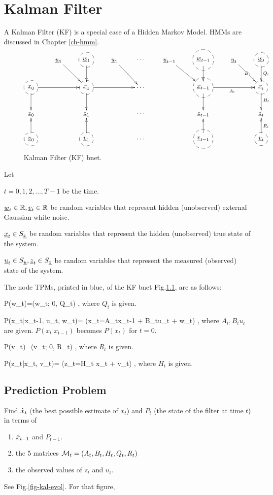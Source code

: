 \chapter{Kalman Filter}\label{ch-kalman}

A Kalman Filter (KF) is a special case of a
Hidden Markov Model. HMMs are
 discussed in Chapter \ref{ch-hmm}.

\begin{figure}[h!]
\centering
$$\xymatrix{
&\rvu_1\ar[dr]
&*++[F-o]{\rvw_1}\ar[d]
&\rvu_1\ar[dr]
&\cdots
&\rvu_{t-1}\ar[dr]
&*++[F-o]{\rvw_{t-1}}\ar[d]
&\rvu_t\ar[dr]|{B_t}
&*++[F-o]{\rvw_{t}}\ar[d]^{Q_t}
\\
*++[F-o]{\rvx_0}\ar[d]\ar[rr]
&&*++[F-o]{\rvx_1}\ar[d]\ar[rr]
&&\cdots
&&*++[F-o]{\rvx_{t-1}}\ar[d]\ar[rr]_{A_t}
&&*++[F-o]{\rvx_{t}}\ar[d]^{H_t}
\\
\rvz_0
&&\rvz_1
&&\cdots
&&\rvz_{t-1}
&
&\rvz_{t}
\\
*++[F-o]{\rvv_0}\ar[u]
&&*++[F-o]{\rvv_1}\ar[u]
&&\cdots
&&*++[F-o]{\rvv_{t-1}}\ar[u]
&&*++[F-o]{\rvv_{t}}\ar[u]_{R_t}
}$$
\caption{Kalman Filter (KF) bnet.}
\label{fig-kal}
\end{figure}

Let 

$t=0, 1, 2, \dots , T-1$ be the time.

${\underline{w}}_t\in{ \mathbb{R}}, {\underline{v}}_t\in { \mathbb{R}}$ be
random variables that represent
hidden (unobserved)   external
Gaussian white noise.

${\underline{x}}_t\in S_{\underline{x}}$ be
random variables that represent
the hidden (unobserved) true
state of the system.

${\underline{u}}_t\in S_{\underline{u}}, {\underline{z}}_t\in S_{\underline{z}}$ be
random variables that represent
the measured (observed) state of the system.


The 
node TPMs,
printed in blue,
of the KF bnet Fig.\ref{fig-kal},
are as follows:

\beq\color{blue}
P(w_t)=\caln(w_t; 0, Q_t)
\;,
\eeq
where $Q_t$ is given.


\beq\color{blue}
P(x_t|x_{t-1}, u_t, w_t)=
\indi(x_t=A_tx_{t-1} + B_tu_t + w_t)
\;,
\eeq
where $A_t, B_tu_t$
are given. $P(x_t|x_{t-1})$ becomes $P(x_t)$
for $t=0$.

\beq\color{blue}
P(v_t)=\caln(v_t; 0, R_t)
\;,
\eeq
where $R_t$ is given.

\beq\color{blue}
P(z_t|x_t, v_t)=
\indi(z_t=H_t x_t +  v_t)
\;,
\eeq
where $H_t$ is given.


\section{Prediction
Problem}
Find ${\hat{x}}_t$ (the 
best possible estimate
of $x_t$)
and $P_t$ (the state of the 
filter at time $t$)
in terms of 
\begin{enumerate}
\item
${\hat{x}}_{t-1}$
and $P_{t-1}$.
\item
 the 5 matrices
${\cal M}_t=(A_t,B_t,H_t,Q_t,R_t)$
\item
the observed  values of 
$z_t$ and $u_t$.

\end{enumerate}
See Fig.\ref{fig-kal-evol}.
For that figure,

